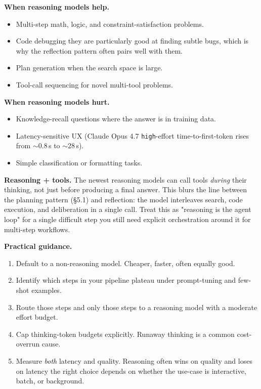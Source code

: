 \documentclass[a4paper,11pt]{article}
\begin{document}
\textbf{When reasoning models help.}
\begin{itemize}[noitemsep, leftmargin=1.2em]
  \item Multi-step math, logic, and constraint-satisfaction problems.
  \item Code debugging \textemdash{} they are particularly good at
        finding subtle bugs, which is why the reflection pattern
        often pairs well with them.
  \item Plan generation when the search space is large.
  \item Tool-call sequencing for novel multi-tool problems.
\end{itemize}

\textbf{When reasoning models hurt.}
\begin{itemize}[noitemsep, leftmargin=1.2em]
  \item Knowledge-recall questions where the answer is in training
        data.
  \item Latency-sensitive UX (Claude Opus 4.7 \texttt{high}-effort
        time-to-first-token rises from $\sim$0.8\,s to $\sim$28\,s).
  \item Simple classification or formatting tasks.
\end{itemize}

\textbf{Reasoning + tools.} The newest reasoning models can call tools
\textit{during} their thinking, not just before producing a final
answer. This blurs the line between the planning pattern (§5.1) and
reflection: the model interleaves search, code execution, and
deliberation in a single call. Treat this as  "reasoning is the
agent loop" for a single difficult step \textemdash{} you still need
explicit orchestration around it for multi-step workflows.

\textbf{Practical guidance.}
\begin{enumerate}[noitemsep, leftmargin=1.4em]
  \item Default to a non-reasoning model. Cheaper, faster, often
        equally good.
  \item Identify which steps in your pipeline plateau under
        prompt-tuning and few-shot examples.
  \item Route those steps \textemdash{} and only those steps
        \textemdash{} to a reasoning model with a moderate effort
        budget.
  \item Cap thinking-token budgets explicitly. Runaway thinking is a
        common cost-overrun cause.
  \item Measure \textit{both} latency and quality. Reasoning often
        wins on quality and loses on latency \textemdash{} the right
        choice depends on whether the use-case is interactive, batch,
        or background.
\end{enumerate}
\end{document}
